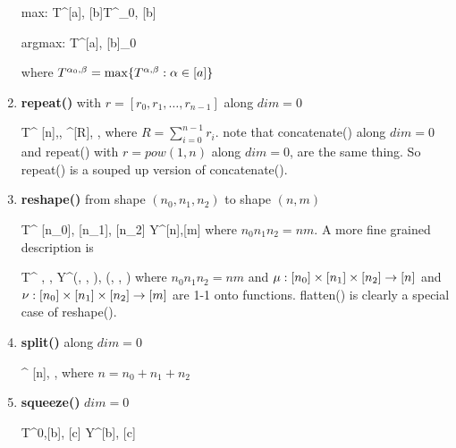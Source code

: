 \begin{enumerate}
\beq
{\rm max:}\;\; T^{[a], [b]}\rarrow T^{\alp_0, [b]}
\eeq

\beq
{\rm argmax:}\;\; T^{[a], [b]}\rarrow \alp_0
\eeq

where $T^{\alpha_0, \beta}=\max\{T^{\alpha, \beta}: \alpha\in[a]\}$



\item {\bf repeat()} with $r=[r_0, r_1, \ldots, r_{n-1}]$
along $dim=0$

\beq
T^{
[n],\beta, \gamma}\rarrow
{}^{[R], \beta, \gamma}
\eeq
where $R=\sum_{i=0}^{n-1}r_i$.
note that concatenate() along $dim=0$ and repeat()
 with $r=pow(1, n)$
along $dim=0$, are the same thing. So repeat() is a
souped up version of concatenate().


\item {\bf reshape()} from shape
$(n_0, n_1, n_2)$ to shape $(n,m)$

\beq
T^{
[n_0],
[n_1],
[n_2]}
\rarrow
Y^{[n],[m]}
\eeq
where
$n_0n_1n_2=nm$. A more fine grained description is

\beq
T^{
\alpha,
\beta,
\gamma}
\rarrow
Y^{\mu(\alpha, \beta, \gamma),
\nu(\alpha, \beta, \gamma)}
\eeq
where $n_0n_1n_2=nm$ and
$\mu:[n_0]\times[n_1]\times[n_2]\rightarrow [n]$
and
$\nu:[n_0]\times[n_1]\times[n_2]\rightarrow [m]$
are 1-1 onto functions.
flatten() is clearly a special case of reshape().


\item {\bf split()} along $dim=0$

\beq
{}^{
[n], \beta, \gamma}
\eeq
where $n= n_0 + n_1 + n_2$




\item {\bf squeeze()} $dim=0$

\beq
T^{0,[b], [c]}
\rarrow
Y^{[b], [c]}
\eeq


\end{enumerate}

